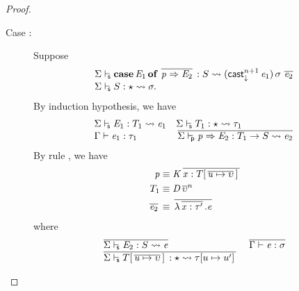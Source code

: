 \begin{proof}
\begin{description}
        \item[Case :] Suppose 
            \[\begin{array}{l}
                 \Sigma  \vdash_{\!\!\mathsf{s} }  \mathbf{case} \, \mathit{E_{{\mathrm{1}}}} \, \mathbf{of} \, \,\overline{  \mathit{p}  \Rightarrow  \mathit{E_{{\mathrm{2}}}}  }\,  :  S   \rightsquigarrow   (  \mathsf{cast}_{\downarrow}^{n+1} \, \mathit{e_{{\mathrm{1}}}}  ) \, \sigma \, \,\overline{  \mathit{e_{{\mathrm{2}}}}  }\,  \\
                 \Sigma  \vdash_{\!\!\mathsf{s} }  S  :  \star   \rightsquigarrow   \sigma .
            \end{array}\]
            By induction hypothesis, we have 
            \[\begin{array}{ll}
                 \Sigma  \vdash_{\!\!\mathsf{s} }  \mathit{E_{{\mathrm{1}}}}  :  T_{{\mathrm{1}}}   \rightsquigarrow   \mathit{e_{{\mathrm{1}}}}  &
                 \Sigma  \vdash_{\!\!\mathsf{s} }  T_{{\mathrm{1}}}  :  \star   \rightsquigarrow   \tau_{{\mathrm{1}}}  \\
                \Gamma  \vdash  \mathit{e_{{\mathrm{1}}}}  :  \tau_{{\mathrm{1}}} &
                \,\overline{   \Sigma  \vdash_{\!\!\mathsf{p} }  \mathit{p}   \Rightarrow   \mathit{E_{{\mathrm{2}}}}  :  T_{{\mathrm{1}}}   \rightarrow   S   \rightsquigarrow   \mathit{e_{{\mathrm{2}}}}   }\,            
            \end{array}\]
            By rule , we have
            \begin{align*}
                \mathit{p} & \equiv  \mathit{K}  \,\overline{  \mathit{x}  :  T  [  \,\overline{  \mathit{u}  \mapsto  \upsilon  }\,  ] \,  }\, \\
                T_{{\mathrm{1}}} & \equiv  \mathit{D}    \,\overline{  \upsilon  }^{n}\, \\
                \,\overline{  \mathit{e_{{\mathrm{2}}}}  }\, & \equiv  \,\overline{  \lambda  \,\overline{  \mathit{x}  :  \tau'  }\,  .  \mathit{e}  }\,
            \end{align*}
            where
            \[\begin{array}{ll}
                \,\overline{   \Sigma  \vdash_{\!\!\mathsf{s} }  \mathit{E_{{\mathrm{2}}}}  :  S   \rightsquigarrow   \mathit{e}   }\, &
                \,\overline{  \Gamma  \vdash  \mathit{e}  :  \sigma  }\, \\
                \,\overline{   \Sigma  \vdash_{\!\!\mathsf{s} }  T  [  \,\overline{  \mathit{u}  \mapsto  \upsilon  }\,  ] \,  :  \star   \rightsquigarrow   \tau  [  u  \mapsto  u'  ] \,   }\, &

\end{array}\]
\end{description}
\end{proof}
